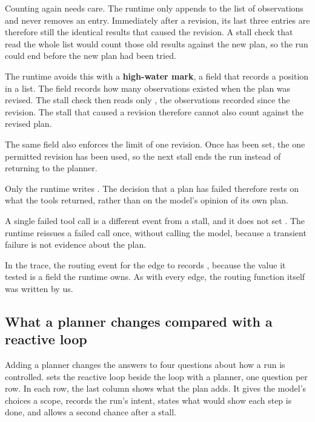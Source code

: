 Counting again needs care. The runtime only appends to the list of observations and never removes an
entry. Immediately after a revision, its last three entries are therefore still the identical results
that caused the revision. A stall check that read the whole list would count those old results
against the new plan, so the run could end before the new plan had been tried.

The runtime avoids this with a \textbf{high-water mark}, a field that records a position in a list.
The field  records how many observations existed when the plan was revised.
The stall check then reads only , the observations recorded
since the revision. The stall that caused a revision therefore cannot also count against the revised
plan.

The same field also enforces the limit of one revision. Once  has been set,
the one permitted revision has been used, so the next stall ends the run instead of returning to the
planner.

Only the runtime writes . The decision that a plan has failed therefore rests on
what the tools returned, rather than on the model's opinion of its own plan.

A single failed tool call is a different event from a stall, and it does not set
. The runtime reissues a failed call once, without calling the model, because
a transient failure is not evidence about the plan.

In the trace, the routing event for the edge to  records ,
because the value it tested is a field the runtime owns. As with every edge, the routing function
itself was written by us.

\subsection{What a planner changes compared with a reactive loop}
\label{sec:planning-decisions}

Adding a planner changes the answers to four questions about how a run is controlled.
 sets the reactive loop beside the loop with a planner, one question per
row. In each row, the last column shows what the plan adds. It gives the model's choices a scope,
records the run's intent, states what would show each step is done, and allows a second chance after
a stall.

